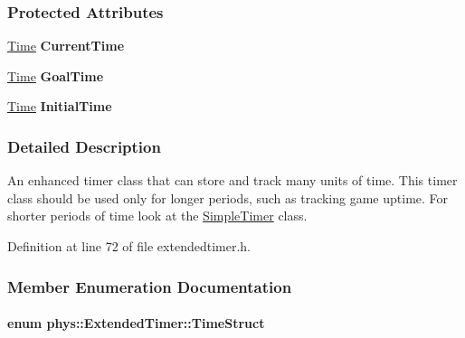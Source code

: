 \subsubsection*{Protected Attributes}
\begin{DoxyCompactItemize}
\item 
\hypertarget{classphys_1_1ExtendedTimer_aa71c8250d0a9953b00e25391c8e6d910}{
\hyperlink{structphys_1_1Time}{Time} {\bfseries CurrentTime}}
\label{classphys_1_1ExtendedTimer_aa71c8250d0a9953b00e25391c8e6d910}

\item 
\hypertarget{classphys_1_1ExtendedTimer_a6dd2ddfeaf989e2c70dc8afd399d8ca8}{
\hyperlink{structphys_1_1Time}{Time} {\bfseries GoalTime}}
\label{classphys_1_1ExtendedTimer_a6dd2ddfeaf989e2c70dc8afd399d8ca8}

\item 
\hypertarget{classphys_1_1ExtendedTimer_a231bf60b0b65a41095b6a4c140596531}{
\hyperlink{structphys_1_1Time}{Time} {\bfseries InitialTime}}
\label{classphys_1_1ExtendedTimer_a231bf60b0b65a41095b6a4c140596531}

\end{DoxyCompactItemize}


\subsubsection{Detailed Description}
An enhanced timer class that can store and track many units of time. This timer class should be used only for longer periods, such as tracking game uptime. For shorter periods of time look at the \hyperlink{classphys_1_1SimpleTimer}{SimpleTimer} class. 

Definition at line 72 of file extendedtimer.h.



\subsubsection{Member Enumeration Documentation}
\hypertarget{classphys_1_1ExtendedTimer_a0f316e9347d1c118a157cc3c737c554b}{
\paragraph[{TimeStruct}]{\setlength{\rightskip}{0pt plus 5cm}enum {\bf phys::ExtendedTimer::TimeStruct}}\hfill}
\label{classphys_1_1ExtendedTimer_a0f316e9347d1c118a157cc3c737c554b}


